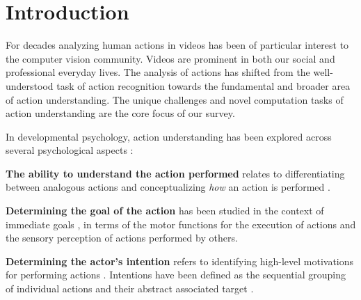 \section{Introduction}


For decades analyzing human actions in videos has been of particular interest to the computer vision community. Videos are prominent in both our social and professional everyday lives. The analysis of actions has shifted from the well-understood task of action recognition towards the fundamental and broader area of action understanding. The unique challenges and novel computation tasks of action understanding are the core focus of our survey. 

In developmental psychology, action understanding has been explored across several psychological aspects \citep{thompson2019conceptualizing}: 

\noindent
\textbf{The ability to understand the action performed} relates to differentiating between analogous actions \citep{gallese1996action,jeannerod1994representing} and conceptualizing \emph{how} an action is performed \citep{spunt2011identifying}. 

\noindent
\textbf{Determining the goal of the action} has been studied in the context of immediate goals \citep{calvo2005action,kohler2002hearing,rizzolatti2001neurophysiological}, in terms of the motor functions for the execution of actions and the sensory perception of actions performed by others.

\noindent
\textbf{Determining the actor's intention} refers to identifying high-level motivations for performing actions \citep{kilner2011more}. Intentions have been defined as the sequential grouping of individual actions \citep{fogassi2005parietal} and their abstract associated target \citep{uithol2011understanding}.

